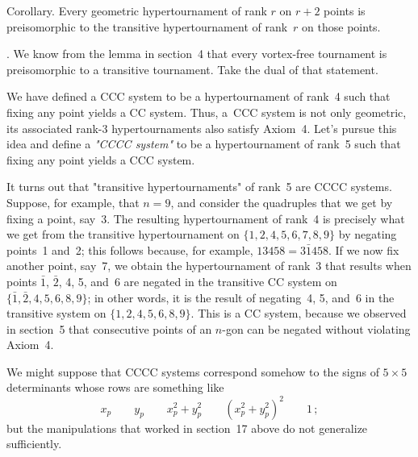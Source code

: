 \proclaim Corollary. Every geometric hypertournament of rank\/ $r$
on\/ $r+2$ points is preisomorphic to the transitive hypertournament
of rank\/~$r$ on those points.

.\quad
We know from the lemma in section~4 that every vortex-free tournament
is preisomorphic to a transitive tournament. Take the dual of that
statement.\quad\pfbox

\bigskip
We have defined a CCC system to be a hypertournament of rank~4 such
that fixing any point yields a CC system. Thus, a~CCC system is not
only geometric, its associated rank-3 hypertournaments also satisfy
Axiom~4. Let's pursue this idea and define a {\it"CCCC system"\/} to be
a hypertournament of rank~5 such that fixing any point yields a CCC
system.

It turns out that "transitive hypertournaments" of rank~5 are CCCC
systems. Suppose, for example, that $n=9$, and consider the quadruples
that we get by fixing a point, say~3. The resulting hypertournament of
rank~4 is precisely what we get from the transitive hypertournament on
$\{1,2,4,5,6,7,8,9\}$ by negating points~1 and~2; this follows
because, for example, $13458=3\bar{1}458$. If we now fix another
point, say~7, we obtain the hypertournament of rank~3 that results
when points $\bar{1}$, $\bar{2}$, 4, 5, and~6 are negated in the
transitive CC system on $\{\bar{1},\bar{2},4,5,6,8,9\}$; in other
words, it is the result of negating~4, 5, and~6 in the transitive
system on $\{1,2,4,5,6,8,9\}$. This is a CC system, because we
observed in section~5 that consecutive points of an $n$-gon can be
negated without violating Axiom~4. 

We might suppose that CCCC systems correspond somehow to the signs of
$5\times 5$ determinants whose rows are something like
$$x_p\qquad y_p\qquad x_p^2+y_p^2\qquad (x_p^2+y_p^2)^2\qquad 1\,;$$
but the manipulations that worked in section~17 above do not generalize
sufficiently. 

